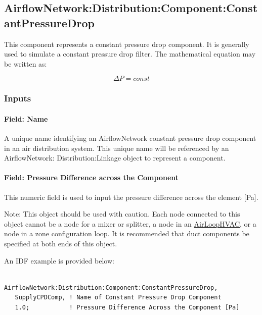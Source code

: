 \subsection{AirflowNetwork:Distribution:Component:ConstantPressureDrop}\label{airflownetworkdistributioncomponentconstantpressuredrop}

This component represents a constant pressure drop component. It is generally used to simulate a constant pressure drop filter. The mathematical equation may be written as:

\begin{equation}
\Delta P = const
\end{equation}

\subsubsection{Inputs}\label{inputs-20}

\paragraph{Field: Name}\label{field-name-18}

A unique name identifying an AirflowNetwork constant pressure drop component in an air distribution system. This unique name will be referenced by an AirflowNetwork: Distribution:Linkage object to represent a component.

\paragraph{Field: Pressure Difference across the Component}\label{field-pressure-difference-across-the-component}

This numeric field is used to input the pressure difference across the element {[}Pa{]}.

Note: This object should be used with caution. Each node connected to this object cannot be a node for a mixer or splitter, a node in an \hyperref[airloophvac]{AirLoopHVAC}, or a node in a zone configuration loop. It is recommended that duct components be specified at both ends of this object.

An IDF example is provided below:

\begin{lstlisting}

AirflowNetwork:Distribution:Component:ConstantPressureDrop,
   SupplyCPDComp, ! Name of Constant Pressure Drop Component
   1.0;           ! Pressure Difference Across the Component [Pa]
\end{lstlisting}

